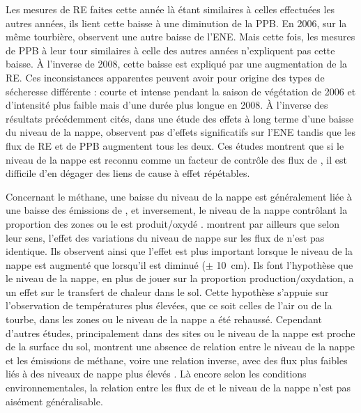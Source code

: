 Les mesures de RE faites cette année là étant similaires à celles effectuées les autres années, ils lient cette baisse à une diminution de la PPB.
En 2006, sur la même tourbière, \citet{lund2012} observent une autre baisse de l'ENE.
Mais cette fois, les mesures de PPB à leur tour similaires à celle des autres années n'expliquent pas cette baisse.
À l'inverse de 2008, cette baisse est expliqué par une augmentation de la RE.
Ces inconsistances apparentes peuvent avoir pour origine des types de sécheresse différente : courte et intense pendant la saison de végétation de 2006 et d'intensité plus faible mais d'une durée plus longue en 2008.
À l'inverse des résultats précédemment cités, \citet{ballantyne2014} dans une étude des effets à long terme d'une baisse du niveau de la nappe, observent pas d'effets significatifs sur l'ENE tandis que les flux de RE et de PPB augmentent tous les deux.
Ces études montrent que si le niveau de la nappe est reconnu comme un facteur de contrôle des flux de \coo, il est difficile d'en dégager des liens de cause à effet répétables.

Concernant le méthane, une baisse du niveau de la nappe est généralement liée à une baisse des émissions de \chh, et inversement, le niveau de la nappe contrôlant la proportion des zones ou le \chh est produit/oxydé \citep{pelletier2007}.
\citet{turetsky2008} montrent par ailleurs que selon leur sens, l'effet des variations du niveau de nappe sur les flux de \chh n'est pas identique.
Ils observent ainsi que l'effet est plus important lorsque le niveau de la nappe est augmenté que lorsqu'il est diminué ($\pm$ \SI{10}{\centi\metre}).
Ils font l'hypothèse que le niveau de la nappe, en plus de jouer sur la proportion production/oxydation, a un effet sur le transfert de chaleur dans le sol.
Cette hypothèse s'appuie sur l'observation de températures plus élevées, que ce soit celles de l'air ou de la tourbe, dans les zones ou le niveau de la nappe a été rehaussé.
Cependant d'autres études, principalement dans des sites ou le niveau de la nappe est proche de la surface du sol, montrent une absence de relation entre le niveau de la nappe et les émissions de méthane, voire une relation inverse, avec des flux plus faibles liés à des niveaux de nappe plus élevés \citep{kettunen1996,bellisario1999,treat2007}.
Là encore selon les conditions environnementales, la relation entre les flux de \chh et le niveau de la nappe n'est pas aisément généralisable.

